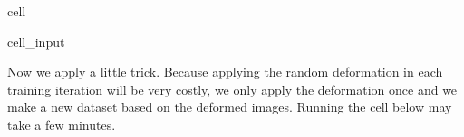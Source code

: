 \documentclass[letterpaper,10pt,english]{jupyterBook}
\begin{document}
\begin{sphinxuseclass}{cell}\begin{sphinxVerbatimInput}

\begin{sphinxuseclass}{cell_input}
\begin{sphinxVerbatim}[commandchars=\\\{\}]
  \PYG{p}{[}\PYG{p}{]}
   \PYG{p}{[}  \PYG{p}{]}
     
\end{sphinxVerbatim}

\end{sphinxuseclass}\end{sphinxVerbatimInput}

\end{sphinxuseclass}
\sphinxAtStartPar
Now we apply a little trick. Because applying the random deformation in each training iteration will be very costly, we only apply the deformation once and we make a new dataset based on the deformed images. Running the cell below may take a few minutes.
\end{document}
